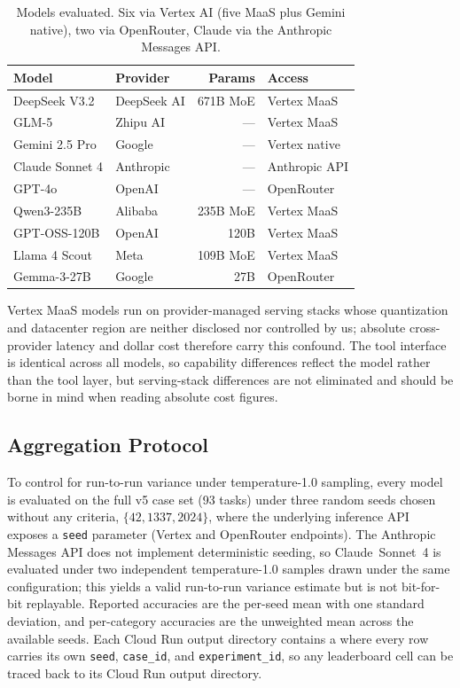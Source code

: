 \documentclass[sigconf]{acmart}
\begin{document}
\begin{table}[ht]
    \caption{Models evaluated. Six via Vertex AI (five MaaS plus Gemini native), two via OpenRouter, Claude via the Anthropic Messages API.}
    \label{tab:models}
    \centering
    \begin{tabular}{llrl}
        \toprule
        \textbf{Model} & \textbf{Provider} & \textbf{Params} & \textbf{Access} \\
        \midrule
        DeepSeek V3.2 & DeepSeek AI & 671B MoE & Vertex MaaS \\
        GLM-5 & Zhipu AI & --- & Vertex MaaS \\
        Gemini 2.5 Pro & Google & --- & Vertex native \\
        Claude Sonnet 4 & Anthropic & --- & Anthropic API \\
        GPT-4o & OpenAI & --- & OpenRouter \\
        Qwen3-235B & Alibaba & 235B MoE & Vertex MaaS \\
        GPT-OSS-120B & OpenAI & 120B & Vertex MaaS \\
        Llama 4 Scout & Meta & 109B MoE & Vertex MaaS \\
        Gemma-3-27B & Google & 27B & OpenRouter \\
        \bottomrule
    \end{tabular}
    \medskip

    {\footnotesize\parbox{\linewidth}{Vertex MaaS models run on provider-managed serving stacks whose quantization and datacenter region are neither disclosed nor controlled by us; absolute cross-provider latency and dollar cost therefore carry this confound. The tool interface is identical across all models, so capability differences reflect the model rather than the tool layer, but serving-stack differences are not eliminated and should be borne in mind when reading absolute cost figures.}}
\end{table}


\subsection{Aggregation Protocol}
\label{sec:aggregation}

To control for run-to-run variance under temperature-1.0 sampling, every model is evaluated on the full v5 case set (93 tasks) under three random seeds chosen without any criteria, $\{42, 1337, 2024\}$, where the underlying inference API exposes a \texttt{seed} parameter (Vertex and OpenRouter endpoints). The Anthropic Messages API does not implement deterministic seeding, so Claude~Sonnet~4 is evaluated under two independent temperature-1.0 samples drawn under the same configuration; this yields a valid run-to-run variance estimate but is not bit-for-bit replayable. Reported accuracies are the per-seed mean with one standard deviation, and per-category accuracies are the unweighted mean across the available seeds. Each Cloud Run output directory contains a  where every row carries its own \texttt{seed}, \texttt{case\_id}, and \texttt{experiment\_id}, so any leaderboard cell can be traced back to its Cloud Run output directory.
\end{document}
